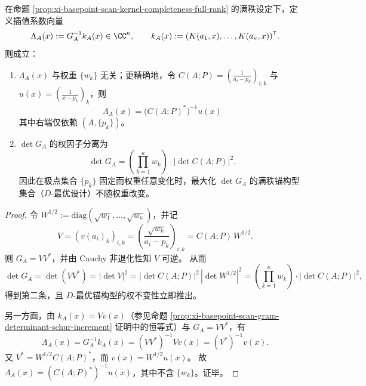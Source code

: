 \begin{proposition}\label{prop:xi-basepoint-scan-full-rank-weight-gauge-invariance}
在命题 \ref{prop:xi-basepoint-scan-kernel-completeness-full-rank} 的满秩设定下，定义插值系数向量
\[
\Lambda_A(x):=G_A^{-1}k_A(x)\in\CC^\kappa,
\qquad
k_A(x):=(K(a_1,x),\dots,K(a_\kappa,x))^{\mathsf T}.
\]
则成立：
\begin{enumerate}
  \item \(\Lambda_A(x)\) 与权重 \(\{w_k\}\) 无关；更精确地，令 \(C(A;P)=(\frac{1}{a_i-p_k})_{i,k}\) 与 \(u(x)=(\frac{1}{x-p_k})_{k}\)，则
  \[
  \boxed{\;\Lambda_A(x)=\bigl(C(A;P)^\ast\bigr)^{-1}u(x)\;}
  \]
  其中右端仅依赖 \((A,\{p_k\})\)。
  \item \(\det G_A\) 的权因子分离为
  \[
  \boxed{\;\det G_A=\left(\prod_{k=1}^{\kappa}w_k\right)\cdot \left|\det C(A;P)\right|^2.\;}
  \]
  因此在极点集合 \(\{p_k\}\) 固定而权重任意变化时，最大化 \(\det G_A\) 的满秩锚构型集合（\(D\)-最优设计）不随权重改变。
\end{enumerate}
\end{proposition}
\begin{proof}
令 \(W^{1/2}:=\mathrm{diag}(\sqrt{w_1},\dots,\sqrt{w_\kappa})\)，并记
\[
V=(v(a_i)_k)_{i,k}=\left(\frac{\sqrt{w_k}}{a_i-p_k}\right)_{i,k}=C(A;P)\,W^{1/2}.
\]
则 \(G_A=VV^\ast\)，并由 Cauchy 非退化性知 \(V\) 可逆。
从而
\[
\det G_A=\det(VV^\ast)=|\det V|^2
=|\det C(A;P)|^2\,|\det W^{1/2}|^2
=\left(\prod_{k=1}^{\kappa}w_k\right)\cdot|\det C(A;P)|^2,
\]
得到第二条，且 \(D\)-最优锚构型的权不变性立即推出。
\par
另一方面，由 \(k_A(x)=Vv(x)\)（参见命题 \ref{prop:xi-basepoint-scan-gram-determinant-schur-increment} 证明中的恒等式）与 \(G_A=VV^\ast\)，有
\[
\Lambda_A(x)=G_A^{-1}k_A(x)=(VV^\ast)^{-1}Vv(x)=(V^\ast)^{-1}v(x).
\]
又 \(V^\ast=W^{1/2}C(A;P)^\ast\)，而 \(v(x)=W^{1/2}u(x)\)。
故 \(\Lambda_A(x)=(C(A;P)^\ast)^{-1}u(x)\)，其中不含 \(\{w_k\}\)。证毕。
\end{proof}

